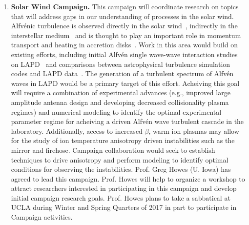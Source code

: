 \documentclass[11pt]{article}
\renewcommand{\cite}{\citep}
\begin{document}
\begin{enumerate}
\item {\bfseries Solar Wind Campaign.} This campaign will
  coordinate research on topics that will address gaps in our
  understanding of processes in the solar wind.  Alfv\'{e}nic
  turbulence is observed directly in the solar wind~\cite{bale05,alexandrova08},
  indirectly in the interstellar medium~\cite{armstrong95} and is thought to play
  an important role in momentum transport and heating in accretion
  disks~\cite{balbus98}.  Work in this area would build on existing efforts,
  including initial Alfvén single wave-wave interaction studies on
  LAPD~\cite{carter:2006,auerbach:2010,auerbach:2011,dorfman:2013,} and comparisons between astrophysical
  turbulence simulation codes and LAPD data~\cite{neilson:2010,howes:2012,howes:2013}.  The generation
  of a turbulent spectrum of Alfv\'{e}n waves in LAPD would be a
  primary target of this effort.  Acheiving this goal will require a
  combination of experimental advances (e.g., improved large amplitude
  antenna design and developing decreased collisionality plasma regimes) and
  numerical modeling to identify the optimal experimental parameter
  regime for acheiving a driven Alfv\'{e}n wave turbulent cascade in
  the laboratory.  Additionally, access to increased $\beta$, warm ion
  plasmas may allow for the study of ion temperature anisotropy driven
  instabilities such as the mirror and firehose.  Campaign
  collaboration would seek to establish techniques to drive anisotropy
  and perform modeling to identify optimal conditions for observing
  the instabilities.  Prof. Greg Howes (U. Iowa) has agreed to
  lead this campaign.  Prof. Howes will help to organize a workshop to
  attract researchers interested in participating in this campaign and
  develop initial campaign research goals.  Prof. Howes plans to take
  a sabbatical at UCLA during Winter and Spring Quarters of 2017 in
  part to participate in Campaign activities.  


\end{enumerate}
\end{document}
